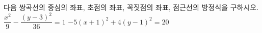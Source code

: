 다음 쌍곡선의 중심의 좌표, 초점의 좌표, 꼭짓점의 좌표, 점근선의 방정식을 구하시오.
 $\dfrac{x^2}{9}-\dfrac{(y-3)^2}{36}=1$
 $-5(x+1)^2+4(y-1)^2=20$
